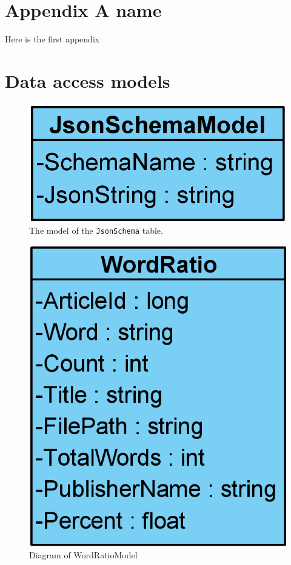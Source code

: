 \chapter{Appendix A name}\label{ch:appAlabel}
Here is the first appendix

\chapter{Data access models}\label{AppDataAccess}
\begin{figure}[H]
    \centering
    \includegraphics[scale=0.25]{Images/JsonSchemaModel.png}
    \caption{The model of the \texttt{JsonSchema} table.}
    \label{JsonSchemaModel}
\end{figure}
\begin{figure}[H]
    \centering
    \includegraphics[scale=0.25]{Images/WordRatioModel.png}
    \caption{Diagram of WordRatioModel}
    \label{WordRatioModel}
\end{figure}